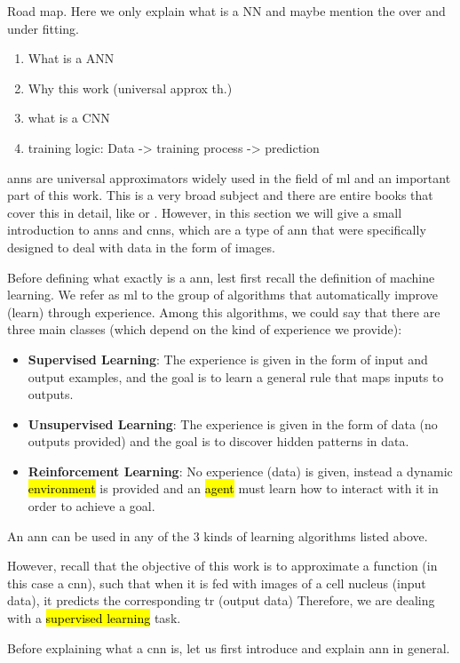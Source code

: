 
\glsresetall

\graphicspath{{./Sections/Basics/Resources/}}

Road map. Here we only explain what is a NN and maybe mention the over and under fitting.
\begin{enumerate}
  \item What is a ANN
  \item Why this work (universal approx th.)
  \item what is a CNN
  \item training logic: Data -> training process -> prediction
\end{enumerate}

\glspl{ann} are universal approximators widely used in the field of \gls{ml} and an important part of this work. This is a very broad subject and there are entire books that cover this in detail, like  \cite{Goodfellow-et-al-2016} or \cite{bishop2006pattern}. However, in this section we will give a small introduction to \glspl{ann} and \glspl{cnn}, which are a type of \gls{ann} that were specifically designed to deal with data in the form of images.

Before defining what exactly is a \gls{ann}, lest first recall the definition of machine learning. We refer as \gls{ml} to the group of algorithms that automatically improve (learn) through experience. Among this algorithms, we could say that there are three main classes (which depend on the kind of experience we provide):

\begin{itemize}
  \item \textbf{Supervised Learning}: The experience is given in the form of input and output examples, and the goal is to learn a general rule that maps inputs to outputs.
  \item \textbf{Unsupervised Learning}: The experience is given in the form of data (no outputs provided) and the goal is to discover hidden patterns in data.
  \item \textbf{Reinforcement Learning}: No experience (data) is given, instead a dynamic \hl{environment} is provided and an \hl{agent} must learn how to interact with it in order to achieve a goal.
\end{itemize}

An \gls{ann} can be used in any of the 3 kinds of learning algorithms listed above.

However, recall that the objective of this work is to approximate a function (in this case a \gls{cnn}), such that when it is fed with images of a cell nucleus (input data), it predicts the corresponding \gls{tr} (output data) Therefore, we are dealing with a \hl{supervised learning} task.

Before explaining what a \gls{cnn} is, let us first introduce and explain \gls{ann} in general.
